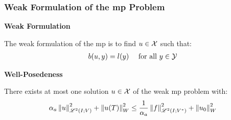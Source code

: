 \begin{frame}
    \frametitle{Weak Formulation of the \acrshort{mp} Problem}

    \vspace*{\fill}
    \begin{center}
        {\color{\accentcolor} \Large \textbf{Weak Formulation}}
        \vspace*{0.25cm}

        \begin{minipage}{0.75\textwidth}
            \begin{definition}
                The weak formulation of the \acrshort{mp} is to find $u \in \mathcal{X}$ such that:
                \begin{align*}
                    b(u, y) &= l(y) &\text{ for all } y \in \mathcal{Y}
                \end{align*}
            \end{definition}
        \end{minipage}
    \end{center}

    \vspace*{\fill}

    \begin{center}
        {\color{\accentcolor} \Large \textbf{Well-Posedeness}}
        \vspace*{0.25cm}

        \begin{minipage}{0.75\textwidth}
            \begin{lemma}
                There exists at most one solution $u \in \mathcal{X}$ of the weak \acrshort{mp} problem with:
                \begin{align*}
                    \alpha_{a} \left\lVert u \right\rVert_{\mathscr{L}^{2}(I; V)}^2 + \left\lVert u(T) \right\rVert_W^2 \leq \frac{1}{\alpha_{a}} \left\lVert f \right\rVert_{\mathscr{L}^{2}(I; V^*)}^2 + \left\lVert u_0 \right\rVert_W^2
                \end{align*}
            \end{lemma}
        \end{minipage}
    \end{center}
    \vspace*{\fill}
    
\end{frame}


